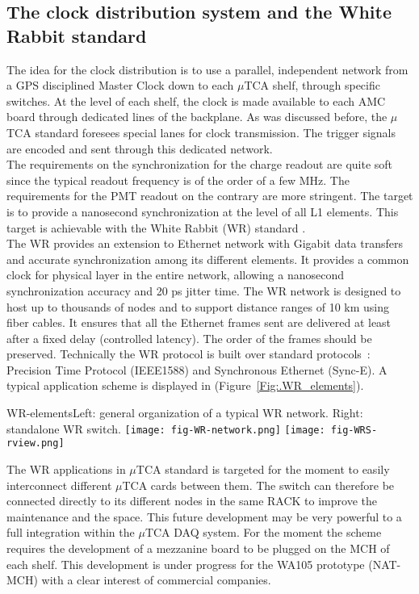 \subsection{The clock distribution system and the White Rabbit standard}

The idea for the clock distribution is to use a parallel, independent network from a GPS disciplined Master Clock down to each $\mu$TCA shelf, through specific switches. At the level of each shelf, the clock is made available to each AMC board through dedicated lines of the backplane. As was discussed before, the $\mu$TCA standard foresees special lanes for clock transmission. The trigger signals are encoded and sent through this dedicated network.\\
The requirements on the synchronization for the charge readout are quite soft since the typical readout frequency is of the order of a few MHz. The requirements for the PMT readout on the contrary are more stringent. The target is to provide a nanosecond synchronization at the level of all L1 elements. This target is achievable with the White Rabbit (WR) standard \cite{WR-standard}.\\

The WR provides an extension to Ethernet network with Gigabit data transfers and accurate synchronization among its different elements. It provides a common clock for physical layer in the entire network, allowing a nanosecond synchronization accuracy and 20 ps jitter time. The WR network is designed to host up to thousands of nodes and to support distance ranges of 10 km using fiber cables. It ensures that all the Ethernet frames sent are delivered at least after a fixed delay (controlled latency). The order of the frames should be preserved. Technically the WR protocol is built over standard protocols~: Precision Time Protocol (IEEE1588) and Synchronous Ethernet (Sync-E). A typical application scheme is displayed in  (Figure~\ref{Fig:.WR_elements}).\\

\begin{cdrfigure}{WR-elements}{\small Left: general organization of a typical WR network. Right: standalone WR switch.}
\texttt{[image: fig-WR-network.png]}
\texttt{[image: fig-WRS-rview.png]}
\end{cdrfigure}

The WR applications in $\mu$TCA standard is targeted for the moment to easily interconnect different $\mu$TCA cards between them. The switch can therefore be connected directly to its different nodes in the same RACK to improve the maintenance and the space. This future development may be very powerful to a full integration within the $\mu$TCA DAQ system. For the moment the scheme requires the development of a mezzanine board to be plugged on the MCH of each shelf. This development is under progress for the WA105 prototype (NAT-MCH) with a clear interest of commercial companies.   
 